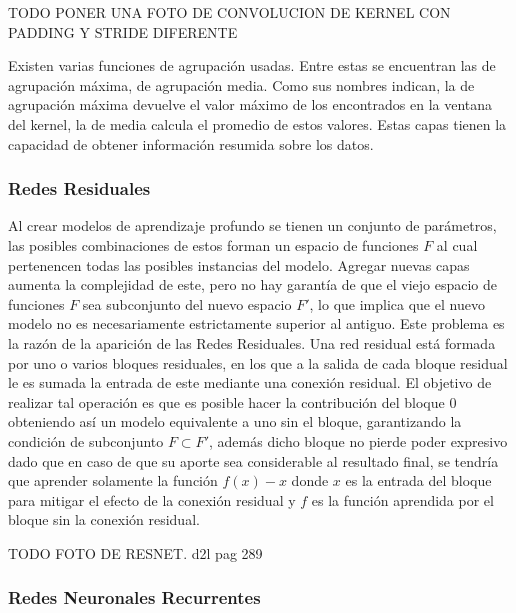 TODO PONER UNA FOTO DE CONVOLUCION DE KERNEL CON PADDING Y STRIDE DIFERENTE

Existen varias funciones de agrupación usadas. Entre estas se encuentran las de agrupación máxima, de 
agrupación media. Como sus nombres indican, la de agrupación máxima devuelve el valor máximo de los encontrados
en la ventana del kernel, la de media calcula el promedio de estos valores. Estas capas tienen la capacidad de obtener
información resumida sobre los datos.

\subsubsection{Redes Residuales}

Al crear modelos de aprendizaje profundo se tienen un conjunto de parámetros, las posibles combinaciones 
de estos forman un espacio de funciones $F$ al cual pertenencen todas las posibles instancias del modelo.
Agregar nuevas capas aumenta la complejidad de este, pero no hay garantía de que el viejo espacio 
de funciones $F$ sea subconjunto del nuevo espacio $F'$, lo que implica que el nuevo modelo no es necesariamente
estrictamente superior al antiguo. Este problema es la razón de la aparición de las Redes Residuales. 
Una red residual está formada por 
uno o varios bloques residuales, en los que a la salida de cada bloque residual le es sumada la entrada de 
este mediante una conexión residual.
El objetivo de realizar tal operación es que es posible hacer la contribución del bloque 0 obteniendo así
un modelo equivalente a uno sin el bloque, garantizando la condición de subconjunto $F \subset F'$, además 
dicho bloque no pierde poder expresivo dado que en caso de que su aporte sea considerable al resultado final, 
se tendría que aprender solamente la función $f(x) - x$ donde $x$ es la entrada del bloque para mitigar el 
efecto de la conexión residual y $f$ es la función aprendida por el bloque sin la conexión residual.

TODO FOTO DE RESNET. d2l pag 289

\subsubsection{Redes Neuronales Recurrentes}

